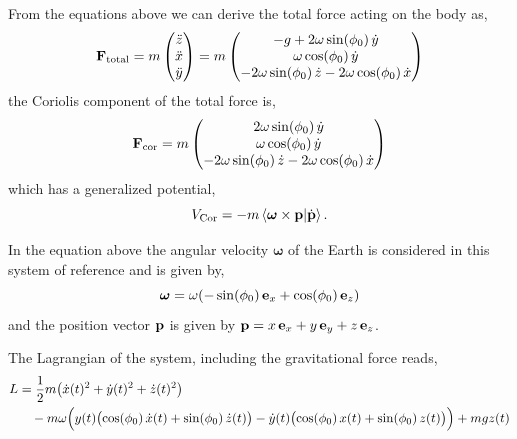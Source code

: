 \documentclass[12pt]{article}
\begin{document}
From the equations above we can derive the total force acting on the body as,
\begin{equation}
  \vb{F}_\text{total} = m
  \begin{pmatrix} \ddot{z} \\ \ddot{x} \\ \ddot{y} \end{pmatrix}
  = m
  \begin{pmatrix}
    -g + 2\omega\sin(\phi_0)\,\dot{y} \\
    \omega\cos(\phi_0)\,\dot{y} \\
    -2\omega\sin(\phi_0)\,\dot{z} - 2\omega\cos(\phi_0)\,\dot{x}
  \end{pmatrix}
\end{equation}
the Coriolis component of the total force is,
\begin{equation}
  \vb{F}_\text{cor} = m
  \begin{pmatrix}
    2\omega\sin(\phi_0)\,\dot{y} \\
    \omega\cos(\phi_0)\,\dot{y} \\
    -2\omega\sin(\phi_0)\,\dot{z} - 2\omega\cos(\phi_0)\,\dot{x}
  \end{pmatrix}
\end{equation}
which has a generalized potential,
\begin{equation}
  V_\text{Cor} = -m\ip{\boldsymbol{\omega}\times\vb{p}}{\dot{\vb{p}}}.
\end{equation}

In the equation above the angular velocity $\boldsymbol{\omega}$ of the Earth is considered
in this system of reference and is given by,
\begin{equation}
  \boldsymbol{\omega} = \omega(-\sin(\phi_0)\,\vb{e}_x + \cos(\phi_0)\,\vb{e}_z)
\end{equation}
and the position vector $\vb{p}$ is given by $\vb{p} = x\,\vb{e}_x + y\,\vb{e}_y + z\,\vb{e}_z$.

The Lagrangian of the system, including the gravitational force reads,
\begin{equation}
  \begin{aligned}
    L &= \frac{1}{2}m\bigl(\dot{x}(t)^2 + \dot{y}(t)^2 + \dot{z}(t)^2\bigr) \\
      &\quad - m\omega\Bigl(y(t)\bigl(\cos(\phi_0)\,\dot{x}(t) + \sin(\phi_0)\,\dot{z}(t)\bigr)
        - \dot{y}(t)\bigl(\cos(\phi_0)\,x(t) + \sin(\phi_0)\,z(t)\bigr)\Bigr) + mgz(t)
  \end{aligned}
\end{equation}
\end{document}
